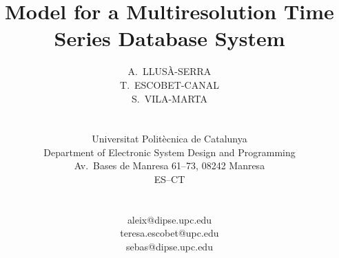 \documentclass[twocolumn,11pt,a4paper]{article}
\begin{document}
\global\def\refname{{\normalsize \it References:}}
%
\baselineskip 12.5pt
%
%
%
\title{\LARGE \bf Model for a Multiresolution Time Series
  Database System}

\date{}

\author{\hspace*{-10pt}
\begin{minipage}[t]{2.3in} \normalsize \baselineskip 12.5pt
\centerline{A.\ LLUSÀ-SERRA}
\end{minipage} \kern 0in
\begin{minipage}[t]{2.3in} \normalsize \baselineskip 12.5pt
\centerline{T.\ ESCOBET-CANAL}
\end{minipage} \kern 0in
\begin{minipage}[t]{2.3in} \normalsize \baselineskip 12.5pt
\centerline{S.\ VILA-MARTA}
\end{minipage} \\ \hspace*{-10pt}
%
\begin{minipage}[t]{2.7in} \normalsize \baselineskip 12.5pt
\centerline{Universitat Politècnica de Catalunya}
\centerline{Department of Electronic System Design and Programming}
\centerline{Av.\ Bases de Manresa 61--73, 08242 Manresa}
\centerline{ES--CT}
\end{minipage} \\ \hspace*{-10pt}
%
\begin{minipage}[t]{2.3in} \normalsize \baselineskip 12.5pt
\centerline{aleix@dipse.upc.edu}
\end{minipage} \kern 0in
\begin{minipage}[t]{2.3in} \normalsize \baselineskip 12.5pt
\centerline{teresa.escobet@upc.edu}
\end{minipage} \kern 0in
\begin{minipage}[t]{2.3in} \normalsize \baselineskip 12.5pt
\centerline{sebas@dipse.upc.edu}
\end{minipage} 
%
%
\\ \\ \hspace*{-10pt}
\begin{minipage}[b]{6.9in} \normalsize

\end{minipage}}
\end{document}
